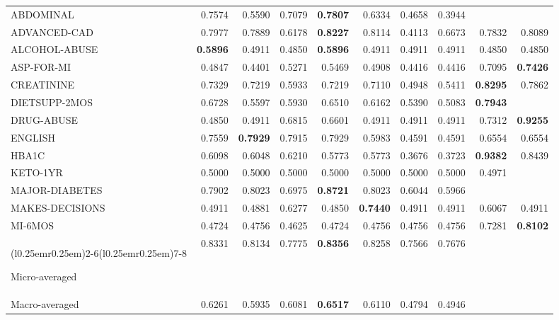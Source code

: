 \begin{table}[!t]
\begin{tabular}{lrrrrrrrrr}
\textsf{ABDOMINAL}       & 0.7574          & 0.5590          & 0.7079 & \textbf{0.7807} & 0.6334          & 0.4658 & 0.3944 &                 &\\
\textsf{ADVANCED-CAD}    & 0.7977          & 0.7889          & 0.6178 & \textbf{0.8227} & 0.8114          & 0.4113 & 0.6673 & 0.7832          & 0.8089\\
\textsf{ALCOHOL-ABUSE}   & \textbf{0.5896} & 0.4911          & 0.4850 & \textbf{0.5896} & 0.4911          & 0.4911 & 0.4911 & 0.4850          & 0.4850\\
\textsf{ASP-FOR-MI}      & 0.4847          & 0.4401          & 0.5271 & 0.5469          & 0.4908          & 0.4416 & 0.4416 & 0.7095          & \textbf{0.7426}\\
\textsf{CREATININE}      & 0.7329          & 0.7219          & 0.5933 & 0.7219          & 0.7110          & 0.4948 & 0.5411 & \textbf{0.8295} & 0.7862\\
\textsf{DIETSUPP-2MOS}   & 0.6728          & 0.5597          & 0.5930 & 0.6510          & 0.6162          & 0.5390 & 0.5083 & \textbf{0.7943} &\\
\textsf{DRUG-ABUSE}      & 0.4850          & 0.4911          & 0.6815 & 0.6601          & 0.4911          & 0.4911 & 0.4911 & 0.7312          & \textbf{0.9255}\\
\textsf{ENGLISH}         & 0.7559          & \textbf{0.7929} & 0.7915 & 0.7929          & 0.5983          & 0.4591 & 0.4591 & 0.6554          & 0.6554\\
\textsf{HBA1C}           & 0.6098          & 0.6048          & 0.6210 & 0.5773          & 0.5773          & 0.3676 & 0.3723 & \textbf{0.9382} & 0.8439\\
\textsf{KETO-1YR}        & 0.5000          & 0.5000          & 0.5000 & 0.5000          & 0.5000          & 0.5000 & 0.5000 & 0.4971          &\\
\textsf{MAJOR-DIABETES}  & 0.7902          & 0.8023          & 0.6975 & \textbf{0.8721} & 0.8023          & 0.6044 & 0.5966 &                 &\\
\textsf{MAKES-DECISIONS} & 0.4911          & 0.4881          & 0.6277 & 0.4850          & \textbf{0.7440} & 0.4911 & 0.4911 & 0.6067          & 0.4911\\
\textsf{MI-6MOS}         & 0.4724          & 0.4756          & 0.4625 & 0.4724          & 0.4756          & 0.4756 & 0.4756 & 0.7281          & \textbf{0.8102}\\

\cmidrule(r{0.25em}){1-1}\cmidrule(l{0.25em}r{0.25em}){2-6}\cmidrule(l{0.25em}r{0.25em}){7-8}\cmidrule(l{0.25em}){9-10}

Micro-averaged & 0.8331 & 0.8134 & 0.7775 & \textbf{0.8356} & 0.8258 & 0.7566 & 0.7676 & &\\
Macro-averaged & 0.6261 & 0.5935 & 0.6081 & \textbf{0.6517} & 0.6110 & 0.4794 & 0.4946 & &\\

\bottomrule

\end{tabular}
\end{table}
\endgroup
